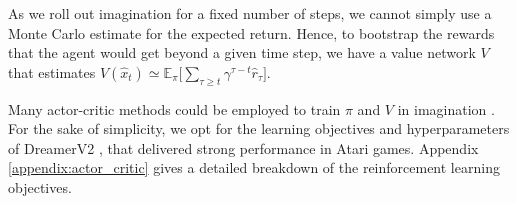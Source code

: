 As we roll out imagination for a fixed number of steps, we cannot simply use a Monte Carlo estimate for the expected return. Hence, to bootstrap the rewards that the agent would get beyond a given time step, we have a value network $V$ that estimates $V(\hat{x}_t) \simeq \mathbb{E}_\pi\big[ \sum_{\tau \ge t} \gamma^{\tau - t} \hat{r}_\tau \big]$.

Many actor-critic methods could be employed to train $\pi$ and $V$ in imagination \citep{sutton, simple, dreamerv1}. For the sake of simplicity, we opt for the learning objectives and hyperparameters of DreamerV2 \citep{dreamerv2}, that delivered strong performance in Atari games. Appendix \ref{appendix:actor_critic} gives a detailed breakdown of the reinforcement learning objectives.